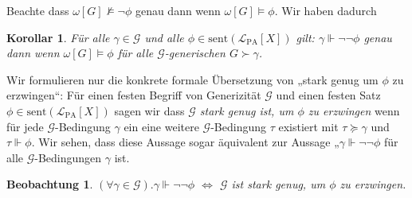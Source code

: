 \documentclass[nofonts]{uebung}
\newtheorem{corollary}[theorem]{Korollar}
\newtheorem{observation}[theorem]{Beobachtung}
\theoremstyle{definition}
\begin{document}
Beachte dass $\omega[G]\not\vDash\neg\phi$ genau dann wenn $\omega[G]\vDash\phi$. Wir haben dadurch
\begin{corollary}\label{cor:double-negation-truth}
    Für alle $\gamma\in\mathcal G$ und alle $\phi\in \mathrm{sent}(\mathcal L_{\mathrm{PA}}[X])$ gilt:
    $\gamma\Vdash\neg\neg\phi$ genau dann wenn $\omega[G]\vDash\phi$ für alle $\mathcal G$-generischen $G\succ\gamma$.
\end{corollary}

Wir formulieren nur die konkrete formale Übersetzung von „stark genug um $\phi$ zu erzwingen“:
Für einen festen Begriff von Generizität $\mathcal G$ und einen festen Satz $\phi\in \mathrm{sent}(\mathcal L_{\mathrm{PA}}[X])$ sagen wir dass \emph{$\mathcal G$ stark genug ist, um $\phi$ zu erzwingen} wenn für jede $\mathcal G$-Bedingung $\gamma$ ein eine weitere $\mathcal G$-Bedingung $\tau$ existiert mit $\tau\succeq \gamma$ und $\tau\Vdash\phi$.
Wir sehen, dass diese Aussage sogar äquivalent zur Aussage „$\gamma\Vdash\neg\neg\phi$ für alle $\mathcal G$-Bedingungen $\gamma$ ist.

\begin{observation}
$(\forall \gamma\in\mathcal G).\gamma\Vdash\neg\neg\phi$ $\iff$ $\mathcal G$ ist stark genug, um $\phi$ zu erzwingen.
\end{observation}

\end{document}
